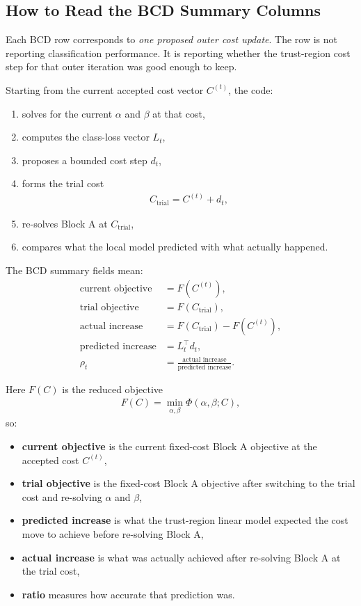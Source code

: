 \documentclass[11pt]{article}
\begin{document}
\subsection{How to Read the BCD Summary Columns}
Each BCD row corresponds to \emph{one proposed outer cost update}. The row is
not reporting classification performance. It is reporting whether the
trust-region cost step for that outer iteration was good enough to keep.

Starting from the current accepted cost vector $C^{(t)}$, the code:
\begin{enumerate}
\item solves for the current $\alpha$ and $\beta$ at that cost,
\item computes the class-loss vector $L_t$,
\item proposes a bounded cost step $d_t$,
\item forms the trial cost
\begin{align}
C_{\mathrm{trial}} = C^{(t)} + d_t,
\end{align}
\item re-solves Block A at $C_{\mathrm{trial}}$,
\item compares what the local model predicted with what actually happened.
\end{enumerate}

The BCD summary fields mean:
\begin{align}
\text{current objective} &= F(C^{(t)}), \\
\text{trial objective} &= F(C_{\mathrm{trial}}), \\
\text{actual increase} &= F(C_{\mathrm{trial}}) - F(C^{(t)}), \\
\text{predicted increase} &= L_t^\top d_t, \\
\rho_t &= \frac{\text{actual increase}}{\text{predicted increase}}.
\end{align}

Here $F(C)$ is the reduced objective
\begin{align}
F(C) = \min_{\alpha,\beta} \Phi(\alpha,\beta;C),
\end{align}
so:
\begin{itemize}
\item \textbf{current objective} is the current fixed-cost Block A objective at
the accepted cost $C^{(t)}$,
\item \textbf{trial objective} is the fixed-cost Block A objective after
switching to the trial cost and re-solving $\alpha$ and $\beta$,
\item \textbf{predicted increase} is what the trust-region linear model expected
the cost move to achieve before re-solving Block A,
\item \textbf{actual increase} is what was actually achieved after re-solving
Block A at the trial cost,
\item \textbf{ratio} measures how accurate that prediction was.
\end{itemize}
\end{document}
